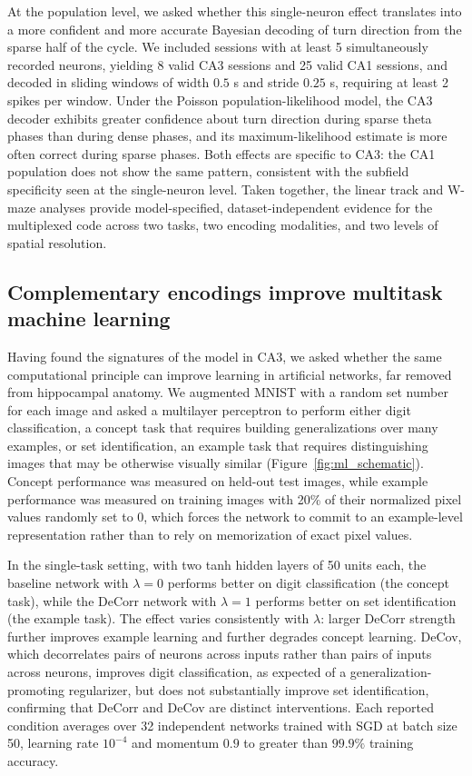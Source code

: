 \documentclass[11pt]{article}
\begin{document}
At the population level, we asked whether this single-neuron effect
translates into a more confident and more accurate Bayesian decoding of
turn direction from the sparse half of the cycle. We included sessions
with at least 5 simultaneously recorded neurons, yielding 8 valid CA3
sessions and 25 valid CA1 sessions, and decoded in sliding windows of
width $0.5$ s and stride $0.25$ s, requiring at least 2 spikes per window.
Under the Poisson population-likelihood model, the CA3 decoder exhibits
greater confidence about turn direction during sparse theta phases than
during dense phases, and its maximum-likelihood estimate is more often
correct during sparse phases. Both effects are specific to CA3: the CA1
population does not show the same pattern, consistent with the subfield
specificity seen at the single-neuron level. Taken together, the linear
track and W-maze analyses provide model-specified, dataset-independent
evidence for the multiplexed code across two tasks, two encoding
modalities, and two levels of spatial resolution.

\subsection{Complementary encodings improve multitask machine learning}

Having found the signatures of the model in CA3, we asked whether the same
computational principle can improve learning in artificial networks, far
removed from hippocampal anatomy. We augmented MNIST with a random set
number for each image and asked a multilayer perceptron to perform either
digit classification, a concept task that requires building generalizations
over many examples, or set identification, an example task that requires
distinguishing images that may be otherwise visually similar
(Figure~\ref{fig:ml_schematic}). Concept performance was measured on
held-out test images, while example performance was measured on training
images with 20\% of their normalized pixel values randomly set to 0, which
forces the network to commit to an example-level representation rather
than to rely on memorization of exact pixel values.

In the single-task setting, with two tanh hidden layers of 50 units each,
the baseline network with $\lambda = 0$ performs better on digit
classification (the concept task), while the DeCorr network with
$\lambda = 1$ performs better on set identification (the example task).
The effect varies consistently with $\lambda$: larger DeCorr strength
further improves example learning and further degrades concept learning.
DeCov, which decorrelates pairs of neurons across inputs rather than pairs
of inputs across neurons, improves digit classification, as expected of a
generalization-promoting regularizer, but does not substantially improve
set identification, confirming that DeCorr and DeCov are distinct
interventions. Each reported condition averages over 32 independent
networks trained with SGD at batch size 50, learning rate $10^{-4}$ and
momentum $0.9$ to greater than $99.9\%$ training accuracy.
\end{document}
